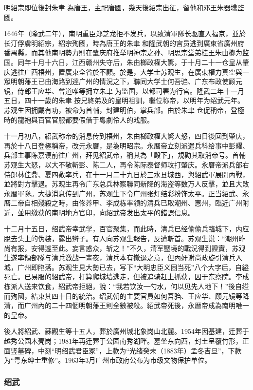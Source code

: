 明紹宗即位後封朱聿{\fzk 𨮁}為唐王，主祀唐國，幾天後紹宗出征，留他和邓王朱器䵺監國。

1646年（隆武二年），南明重臣郑芝龙拒不发兵，以致清軍隊长驱直入福京，並於长汀俘虜明紹宗，紹宗殉國，時為唐王的朱聿{\fzk 𨮁}和隆武朝的宫员逃到廣東省廣州府番禺縣，而其他南明勢力則在肇庆府推举明神宗之孙、明思宗堂弟桂王朱由榔为监国。同年十月十六日，江西赣州失守后，朱由榔政權大驚，于十月二十一仓皇从肇庆逃往广西梧州，置廣東全省於不顧。於是，大学士苏观生，在廣東權力真空與一眾明朝藩王已由海路到達广州的情況之下，聯同大学士何吾驺、广东布政使顾元镜，侍郎王应华、曾道唯等拥立朱聿{\fzk 𨮁}为监国，以都司署为行宫。隆武二年十一月五日，四十一歲的朱聿{\fzk 𨮁}按兄終弟及的皇明祖訓，繼位称帝，以明年为绍武元年。苏观生因拥戴有功，被命为首輔，封建明伯，掌兵部。由於朱聿{\fzk 𨮁}仓促稱帝，登極時的龍袍與百官官服都要假借于粵劇伶人的戏服。

十一月初八，紹武称帝的消息传到梧州，朱由榔政權大驚大怒，四日後回到肇庆，再於十八日登極稱帝，改元永曆，是為明昭宗。永曆帝立刻派遣兵科给事中彭耀、兵部主事陈嘉谟前往广州，拜见紹武帝，稱其為「殿下」，規勸其取消帝号。首輔苏观生大怒，以大不敬斬彭、陈二人，再令陈际泰督师攻打肇庆。永曆帝派兵部右侍郎林佳鼎、夏四敷率兵，在十一月二十九日於三水县城西，與紹武軍展開內戰，並將對方擊退。苏观生再令广东总兵林察聯同新降的海盗等数万人反擊，並且大敗永曆軍隊。大捷消息传到广州，苏观生下令广州张灯结彩粉饰太平。正当紹武、永曆二帝自相殘殺之時，由佟养甲、李成栋率领的清兵已取潮州、惠州，臨近广州附近，並用缴获的南明地方官印，向紹武帝发出太平的錯誤信息。

十二月十五日，绍武帝幸武学，百官聚集，而此時，清兵已经偷偷兵臨城下，内应脫去头上的伪装，露出辫子。有人向苏观生報告，反遭斬首。苏观生说：“潮州昨尚有报，安得遽至此。妄言惑众，斩之！”不久，清军壓境的戰況得到證實，苏观生遂率領部隊与清兵激战一晝夜，清兵本有撤退之意，但內奸谢尚政旋引清兵入城，广州即陷落。苏观生見大勢已去，写下“大明忠臣义固当死”八个大字后，自縊死亡。已易服的紹武帝，打算爬城墙逃走，但被追骑赶上抓获，囚于东察院。李成栋派人送来饮食，紹武帝拒絕，說：“我若饮汝一勺水，何以见先人地下！”後自缢而殉國，結束其四十日的統治。绍武朝的主要官員如何吾驺、王应华、顾元镜等降清，而广州內的二十四個明朝藩王則全數被殺。紹武帝死後，永曆帝成為南明唯一的皇帝。

後人將紹武、蘇觀生等十五人，葬於廣州城北象岗山北麓。1954年因基建，迁葬于越秀公园木壳岗；1981年再迁葬于公园南秀湖畔。墓坐东向西，封土呈覆竹形，正面竖墓碑，中刻“明绍武君臣冢”，上款为“光绪癸未（1883年）孟冬吉旦”，下款为“粤东绅士重修”。1963年3月广州市政府公布为市级文物保护单位。

\subsubsection{绍武}

